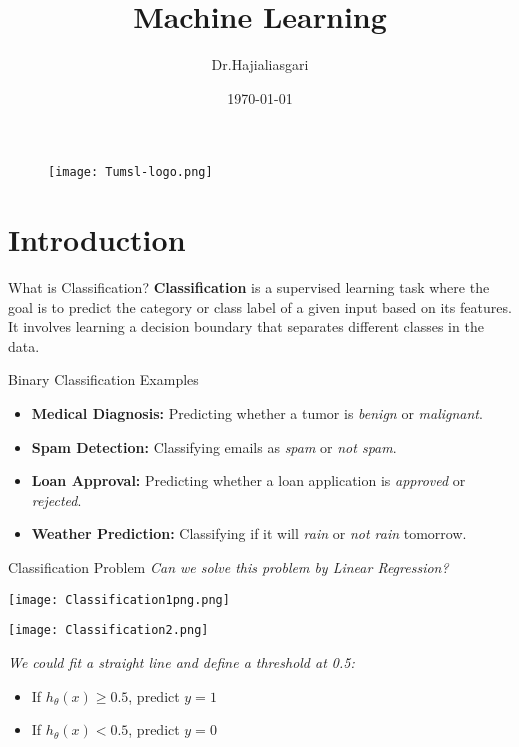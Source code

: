 \documentclass[serif, aspectratio=169]{beamer}
\author{Dr.Hajialiasgari}
\title{Machine Learning}
\institute{
    Tehran University \\
    Of\\
    Medical Science
}
\date{\small \today}
\begin{document}
\begin{frame}
    \titlepage
    \vspace*{-0.6cm}
    \begin{figure}[htpb]
        \begin{center}
            \texttt{[image: Tumsl-logo.png]}
        \end{center}
    \end{figure}
\end{frame}

\begin{frame}    
\tableofcontents[sectionstyle=show, subsectionstyle=show/shaded/hide, subsubsectionstyle=show/shaded/hide]
\end{frame}

\section{Introduction}
\begin{frame}{What is Classification?}
\textbf{Classification} is a supervised learning task where the goal is to predict the category or class label of a given input based on its features. It involves learning a decision boundary that separates different classes in the data.
\end{frame}

\begin{frame}{Binary Classification Examples}
\begin{itemize}
    \item \textbf{Medical Diagnosis:} Predicting whether a tumor is \textit{benign} or \textit{malignant}.
    \item \textbf{Spam Detection:} Classifying emails as \textit{spam} or \textit{not spam}.
    \item \textbf{Loan Approval:} Predicting whether a loan application is \textit{approved} or \textit{rejected}.
    \item \textbf{Weather Prediction:} Classifying if it will \textit{rain} or \textit{not rain} tomorrow.
\end{itemize}
\end{frame}

\begin{frame}{Classification Problem}
\textit{Can we solve this problem by Linear Regression?}
\begin{minipage}{0.48\linewidth}
        \centering
        \texttt{[image: Classification1png.png]}
    \end{minipage}
    \hfill
    \begin{minipage}{0.48\linewidth}
        \centering
        \texttt{[image: Classification2.png]}
    \end{minipage}
\vspace{0.5cm}
\textit{We could fit a straight line and define a threshold at 0.5:}
\begin{itemize}
    \item If $h_\theta(x) \geq 0.5$, predict $y = 1$
    \item If $h_\theta(x) < 0.5$, predict $y = 0$
\end{itemize}
\end{frame}
\end{document}
